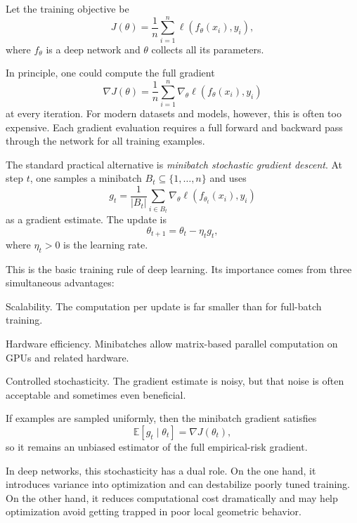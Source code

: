Let the training objective be
\[
J(\theta)=\frac{1}{n}\sum_{i=1}^n \ell(f_\theta(x_i),y_i),
\]
where $f_\theta$ is a deep network and $\theta$ collects all its parameters.

\medskip

In principle, one could compute the full gradient
\[
\nabla J(\theta)
=
\frac{1}{n}\sum_{i=1}^n \nabla_\theta \ell(f_\theta(x_i),y_i)
\]
at every iteration.
For modern datasets and models, however, this is often too expensive.
Each gradient evaluation requires a full forward and backward pass through the network for all training examples.

\medskip

The standard practical alternative is \emph{minibatch stochastic gradient descent}.
At step $t$, one samples a minibatch $B_t\subseteq \{1,\dots,n\}$ and uses
\[
g_t
=
\frac{1}{|B_t|}
\sum_{i\in B_t}
\nabla_\theta \ell(f_{\theta_t}(x_i),y_i)
\]
as a gradient estimate.
The update is
\[
\theta_{t+1}
=
\theta_t-\eta_t g_t,
\]
where $\eta_t>0$ is the learning rate.

\medskip

This is the basic training rule of deep learning.
Its importance comes from three simultaneous advantages:

\begin{paragraph}{Scalability.}
The computation per update is far smaller than for full-batch training.
\end{paragraph}

\begin{paragraph}{Hardware efficiency.}
Minibatches allow matrix-based parallel computation on GPUs and related hardware.
\end{paragraph}

\begin{paragraph}{Controlled stochasticity.}
The gradient estimate is noisy, but that noise is often acceptable and sometimes even beneficial.
\end{paragraph}

\medskip

If examples are sampled uniformly, then the minibatch gradient satisfies
\[
\mathbb{E}[g_t\mid \theta_t]=\nabla J(\theta_t),
\]
so it remains an unbiased estimator of the full empirical-risk gradient.

\medskip

In deep networks, this stochasticity has a dual role.
On the one hand, it introduces variance into optimization and can destabilize poorly tuned training.
On the other hand, it reduces computational cost dramatically and may help optimization avoid getting trapped in poor local geometric behavior.

